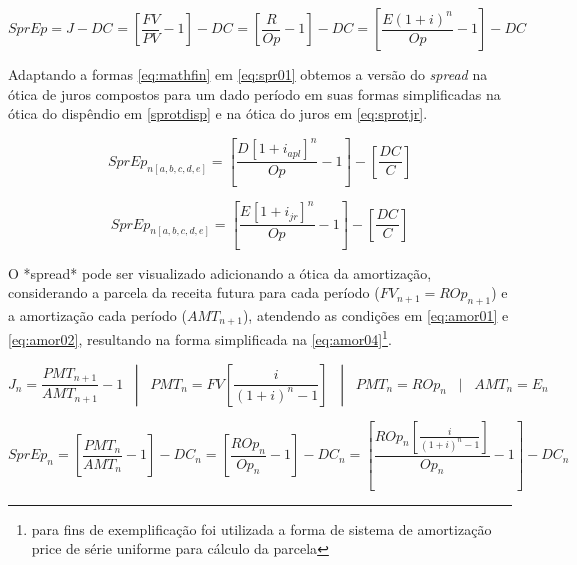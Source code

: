 \documentclass[
  12pt,
  12pt,
  openright,
  oneside,
  a4paper,
  chapter=TITLE,
  section=TITLE,
  subsection=TITLE,
  subsubsection=TITLE,
  portugues,
  sumario=tradicional]{abntex2}
\begin{document}
\begin{apendicesenv}
\begin{equation}\label{eq:sprmf}
SprEp = J - DC_{} = [\frac{FV}{PV} - 1] - DC_{} = [\frac{R}{Op} - 1] - DC = [\frac{E(1 + i)^n}{Op} - 1] - DC_{}
\end{equation}



Adaptando a formas \autoref{eq:mathfin} em \autoref{eq:spr01} obtemos a versão do \emph{spread} na ótica de juros compostos para um dado período em suas formas simplificadas na ótica do dispêndio em \autoref{sprotdisp}  e na ótica do juros em \autoref{eq:sprotjr}. 



\begin{equation}\label{sprotdisp}
SprEp_{n[a,b,c,d,e]} = \left[  \frac{D_{}[1 + i_{apl}]^n  }{Op_{}} -1  \right] - \left[  \frac{DC_{}}{C}  \right]
\end{equation}



\begin{equation}\label{eq:sprotjr}
SprEp_{n[a,b,c,d,e]} = \left[  \frac{E_{}[1 + i_{jr}]^n }{Op_{}} -1  \right] - \left[  \frac{DC_{}}{C} \right]
\end{equation}



O *spread* pode ser visualizado adicionando a ótica da amortização, considerando a parcela da receita futura para cada período ($FV_{n+1} = ROp_{n+1}$) e a amortização cada período ($AMT_{n+1}$), atendendo as condições em \autoref{eq:amor01} e \autoref{eq:amor02}, resultando na forma simplificada na \autoref{eq:amor04}\footnote{para fins de exemplificação foi utilizada a forma de sistema de amortização price de série uniforme para cálculo da parcela}.



\begin{equation}\label{eq:amor01}
J_{n} = \frac{PMT_{n+1}}{AMT_{n+1}} - 1 \hspace{10pt} | \hspace{10pt} PMT_{n} = FV[\frac{i}{(1 + i)^n - 1}]  \hspace{10pt} | \hspace{10pt} PMT_{n} = ROp_{n} \hspace{10pt} | \hspace{10pt} AMT_{n} = E_{n}
\end{equation}




\begin{equation}\label{eq:amor02}
SprEp_{n} = [\frac{PMT_{n}}{AMT_{n}} -1] - DC_{n} = [\frac{ROp_{n}}{Op_{n}} -1] - DC_{n} = [\frac{ROp_{n}[\frac{i}{(1 + i)^n - 1}]}{Op_{n}} -1] - DC_{n}
\end{equation}





\end{apendicesenv}
\end{document}
